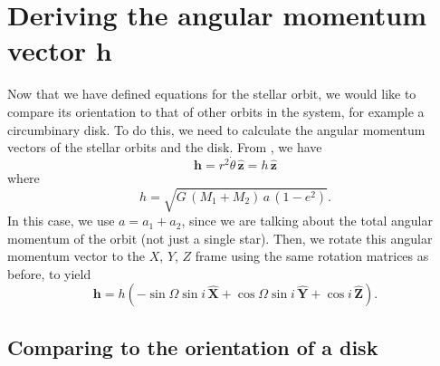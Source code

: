 \documentclass[modern]{aastex61}
\begin{document}
\section{Deriving the angular momentum vector ${\bm h}$}
Now that we have defined equations for the stellar orbit, we would like to compare its orientation to that of other orbits in the system, for example a circumbinary disk. To do this, we need to calculate the angular momentum vectors of the stellar orbits and the disk. From \citet[Eqn 5,][]{murray10}, we have
\begin{equation}
  {\bm h} = r^2 \dot{\theta} \, \hat{\bm z} =  h \, \hat{\bm z}
\end{equation}
where
\begin{equation}
  h = \sqrt{G\,(M_1 + M_2)\, a \, (1 - e^2)}.
\end{equation}
In this case, we use $a = a_1 + a_2$, since we are talking about the total angular momentum of the orbit (not just a single star). Then, we rotate this angular momentum vector to the $X$, $Y$, $Z$ frame using the same rotation matrices as before, to yield
\begin{equation}
  {\bm h} = h(-\sin \Omega \sin i \, \hat{\bm X} + \cos \Omega \sin i \, \hat{\bm Y} + \cos i \, \hat{\bm Z}).
  \label{eqn:angular_mom}
\end{equation}

\subsection{Comparing to the orientation of a disk}
\end{document}
